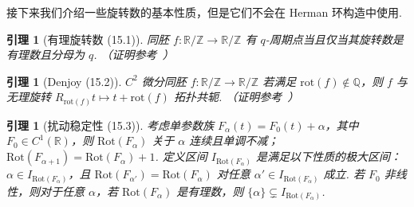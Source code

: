 \documentclass[11pt, a4paper, oneside]{ctexart}
\newtheorem{lemma}[theorem]{引理}
\newcommand{\Q}{\mathbb{Q}}
\newcommand{\R}{\mathbb{R}}
\newcommand{\Z}{\mathbb{Z}}
\newcommand{\Rot}{\mathrm{Rot}}
\newcommand{\rot}{\mathrm{rot}}
\begin{document}
    接下来我们介绍一些旋转数的基本性质，但是它们不会在 Herman 环构造中使用.
    \begin{lemma}[有理旋转数 (15.1)]
        同胚 $f:\R/\Z\to \R/\Z$ 有 $q$-周期点当且仅当其旋转数是有理数且分母为 $q$. （证明参考~\cite[命题 11.1.4]{KH95}）
    \end{lemma}

    \begin{lemma}[Denjoy (15.2)]
        $C^2$ 微分同胚 $f:\R/\Z\to \R/\Z$ 若满足 $\rot(f)\notin\Q$，则 $f$ 与无理旋转 $R_{\rot(f)}t\mapsto t+\rot(f)$ 拓扑共轭. （证明参考~\cite[定理 12.1.1]{KH95}）
    \end{lemma}

    \begin{lemma}[扰动稳定性 (15.3)]
        考虑单参数族 $F_{\alpha}(t)=F_0(t)+\alpha$，其中 $F_0\in C^1(\R)$，则 $\Rot(F_{\alpha})$ 关于 $\alpha$ 连续且单调不减；$\Rot(F_{\alpha+1})=\Rot(F_{\alpha})+1$. 定义区间 $I_{\Rot(F_{\alpha})}$ 是满足以下性质的极大区间：$\alpha\in I_{\Rot(F_{\alpha})}$，且 $\Rot(F_{\alpha'})=\Rot(F_{\alpha})$ 对任意 $\alpha'\in I_{\Rot(F_{\alpha})}$ 成立. 若 $F_0$ 非线性，则对于任意 $\alpha$，若 $\Rot(F_{\alpha})$ 是有理数，则 $\{\alpha\}\subsetneq I_{\Rot(F_{\alpha})}$.
    \end{lemma}
\end{document}

